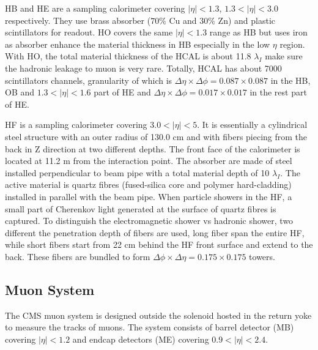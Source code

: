 HB and HE are a sampling calorimeter covering $|\eta|< 1.3$, $1.3<|\eta|< 3.0$ respectively. They use brass absorber ($70\%$ Cu and $30\%$ Zn) and plastic scintillators for readout. HO covers the same $|\eta|< 1.3$ range as HB but uses iron as absorber enhance the material thickness in HB especially in the low $\eta$ region. With HO, the total material thickness of the HCAL is about 11.8 $\lambda_I$ make sure the hadronic leakage to muon is very rare. Totally, HCAL has about 7000 scintillators channels, granularity of which is $\Delta \eta \times \Delta \phi = 0.087 \times 0.087$ in the HB, OB and $1.3<|\eta|< 1.6$ part of HE and $\Delta \eta \times \Delta \phi = 0.017 \times 0.017$ in the rest part of HE.

HF is a sampling calorimeter covering $3.0 < |\eta| < 5$. It is essentially a cylindrical steel structure with an outer radius of 130.0 cm and with fibers piecing from the back in Z direction at two different depths. The front face of the calorimeter is located at 11.2 m from the interaction point. The absorber are made of steel installed perpendicular to beam pipe with a total material depth of 10 $\lambda_I$. The active material is quartz fibres (fused-silica core and polymer hard-cladding) installed in parallel with the beam pipe. When particle showers in the HF, a small part of Cherenkov light generated at the surface of quartz fibres is captured. To distinguish the electromagnetic shower vs hadronic shower, two different the penetration depth of fibers are used, long fiber span the entire HF, while short fibers start from 22 cm behind the HF front surface and extend to the back. These fibers are bundled to form $\Delta \phi \times \Delta \eta = 0.175 \times 0.175$ towers. 


\subsection{Muon System}
The CMS muon system \cite{cms:muonChamberTdr:CMS:1997iti} is designed outside the solenoid hosted in the return yoke to measure the tracks of muons. The system consists of barrel detector (MB) covering $|\eta|<1.2$ and endcap detectors (ME) covering $0.9 < |\eta| < 2.4$. 

